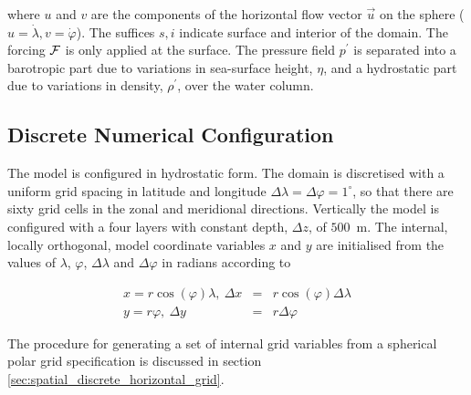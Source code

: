 \noindent where $u$ and $v$ are the components of the horizontal
flow vector $\vec{u}$ on the sphere ($u=\dot{\lambda},v=\dot{\varphi}$).
The suffices ${s},{i}$ indicate surface and interior of the domain.
The forcing $\cal F$ is only applied at the surface.
The pressure field $p^{'}$ is separated into a barotropic part
due to variations in sea-surface height, $\eta$, and a hydrostatic
part due to variations in density, $\rho^{'}$, over the water column.

\subsection{Discrete Numerical Configuration}

 The model is configured in hydrostatic form.  The domain is discretised with 
a uniform grid spacing in latitude and longitude
 $\Delta \lambda=\Delta \varphi=1^{\circ}$, so 
that there are sixty grid cells in the zonal and meridional directions. 
Vertically the 
model is configured with a four layers with constant depth, 
$\Delta z$, of $500$~m. The internal, locally orthogonal, model coordinate 
variables $x$ and $y$ are initialised from the values of
$\lambda$, $\varphi$, $\Delta \lambda$ and $\Delta \varphi$ in
radians according to

\begin{eqnarray}
x=r\cos(\varphi)\lambda,~\Delta x & = &r\cos(\varphi)\Delta \lambda \\
y=r\varphi,~\Delta y &= &r\Delta \varphi
\end{eqnarray}

The procedure for generating a set of internal grid variables from a
spherical polar grid specification is discussed in section 
\ref{sec:spatial_discrete_horizontal_grid}.

\noindent{}\\



